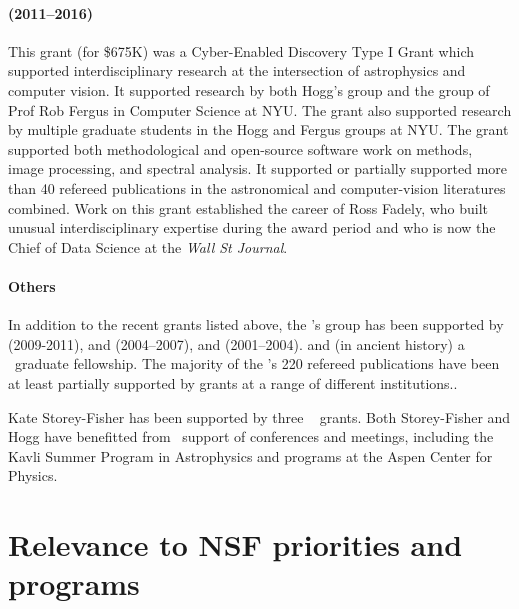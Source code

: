 \documentclass[12pt, fullpage, letterpaper]{article}
\begin{document}
\paragraph{
 (2011--2016)}
This grant (for \$675K) was a Cyber-Enabled Discovery Type I Grant
which supported interdisciplinary research at the intersection of
astrophysics and computer vision.  It supported research by both
Hogg's group and the group of Prof Rob Fergus in Computer Science at
NYU.
The grant also supported research by multiple graduate students in the
Hogg and Fergus groups at NYU.
The grant supported both methodological and open-source software work
on  methods, image processing, and spectral analysis.
It supported or partially supported
more than 40 refereed publications in the astronomical and
computer-vision literatures combined.
Work on this grant established the career of Ross Fadely, who built unusual
interdisciplinary expertise during the award period and who is now the
Chief of Data Science at the \textit{Wall St Journal}.

\paragraph{Others}
In addition to the recent grants listed above, the \PI's group has been supported by
 (2009-2011),
and
 (2004--2007),
and
 (2001--2004).
and (in ancient history) a \NSF\ graduate fellowship.
The majority of the \PI's 220 refereed publications have been at least partially supported
by \NSF grants at a range of different institutions..

Kate Storey-Fisher has been supported by three \NSF\  grants.
Both Storey-Fisher and Hogg have benefitted from \NSF\ support of conferences and meetings,
including the Kavli Summer Program in Astrophysics and programs at the Aspen Center for Physics.

\section{Relevance to NSF priorities and programs}
\end{document}
